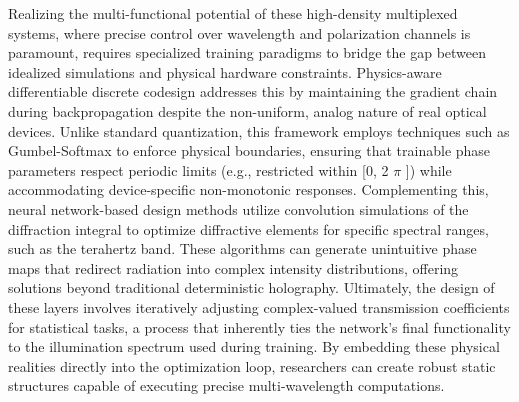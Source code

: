 \documentclass[11pt]{article}
\begin{document}
Realizing the multi-functional potential of these high-density multiplexed systems, where precise control over wavelength and polarization channels is paramount, requires specialized training paradigms to bridge the gap between idealized simulations and physical hardware constraints. Physics-aware differentiable discrete codesign addresses this by maintaining the gradient chain during backpropagation despite the non-uniform, analog nature of real optical devices. Unlike standard quantization, this framework employs techniques such as Gumbel-Softmax to enforce physical boundaries, ensuring that trainable phase parameters respect periodic limits (e.g., restricted within {[}0, 2 \(\pi\) {]}) while accommodating device-specific non-monotonic responses. \citep{doi_10_1145_3508352_3549378_13c53996} Complementing this, neural network-based design methods utilize convolution simulations of the diffraction integral to optimize diffractive elements for specific spectral ranges, such as the terahertz band. These algorithms can generate unintuitive phase maps that redirect radiation into complex intensity distributions, offering solutions beyond traditional deterministic holography. Ultimately, the design of these layers involves iteratively adjusting complex-valued transmission coefficients for statistical tasks, a process that inherently ties the network's final functionality to the illumination spectrum used during training. By embedding these physical realities directly into the optimization loop, researchers can create robust static structures capable of executing precise multi-wavelength computations. \citep{doi_10_1145_3508352_3549378_13c53996} \citep{doi_10_1109_tthz_2023_3344020_a0a550ba} \citep{doi_10_1021_acsphotonics_0c01583_7c90196c}
\end{document}
